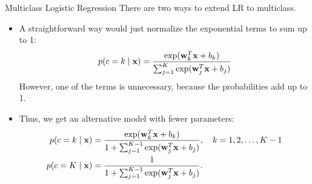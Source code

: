 \documentclass[10pt, aspectratio=169]{beamer} %
\newcommand{\w}{{\bf w}}
\newcommand{\x}{{\bf x}}
\begin{document}
\begin{frame}{Multiclass Logistic Regression}
There are two ways to extend LR to multiclass.
\begin{itemize}
\item[\ding{202}] A straightforward way would just normalize the exponential terms to sum up to 1:
\begin{align*}
p(c = k\mid \x) = \frac{\exp(\w_k^T\x + b_k)}{\sum_{j=1}^K\exp(\w_j^T\x + b_j)}
\end{align*}
However, one of the terms is unnecessary, because the probabilities add up to 1.
\item[\ding{203}] Thus, we get an alternative model with fewer parameters:
\begin{align*}
p(c = k\mid \x) &= \frac{\exp(\w_k^T\x + b_k)}{1 + \sum_{j=1}^{K-1}\exp(\w_j^T\x + b_j)}, \quad k = 1,2,\ldots, K-1\\
p(c = K\mid \x) &= \frac{1}{1 + \sum_{j=1}^{K-1}\exp(\w_j^T\x + b_j)}.
\end{align*}
\end{itemize}
\end{frame}
\end{document}
